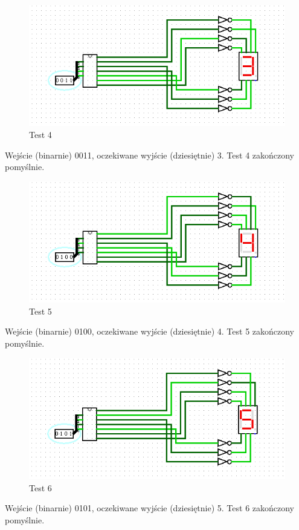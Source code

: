 \begin{figure}[H]
    \includegraphics[width=\linewidth]{logisim_screenshots/3.png}
    \caption{Test 4}
    \label{fig:test3}
\end{figure}
Wejście (binarnie) 0011, oczekiwane wyjście (dziesiętnie) 3.\newline
Test 4 zakończony pomyślnie.

\begin{figure}[H]
    \includegraphics[width=\linewidth]{logisim_screenshots/4.png}
    \caption{Test 5}
    \label{fig:test4}
\end{figure}
Wejście (binarnie) 0100, oczekiwane wyjście (dziesiętnie) 4.\newline
Test 5 zakończony pomyślnie.

\begin{figure}[H]
    \includegraphics[width=\linewidth]{logisim_screenshots/5.png}
    \caption{Test 6}
    \label{fig:test5}
\end{figure}
Wejście (binarnie) 0101, oczekiwane wyjście (dziesiętnie) 5.\newline
Test 6 zakończony pomyślnie.

